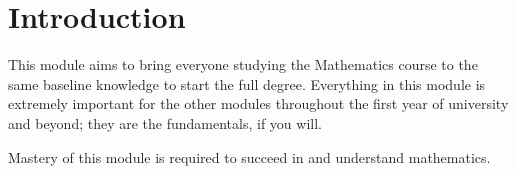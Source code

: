 \documentclass[../ium.tex]{subfiles}
\begin{document}
\chapter*{Introduction}

This module aims to bring everyone studying the Mathematics course to the same baseline knowledge to start the full degree. Everything in this module is extremely important for the other modules throughout the first year of university and beyond; they are the fundamentals, if you will.

Mastery of this module is required to succeed in and understand mathematics.
\end{document}
